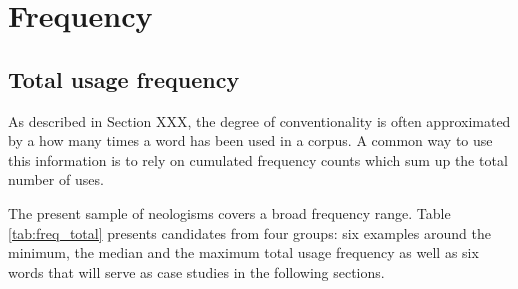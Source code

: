 \documentclass[a4paper, abstract=on]{scrartcl}
\begin{document}
\section{Frequency}

  \subsection{Total usage frequency}

    As described in Section XXX, the degree of conventionality is often approximated by a how many times a word has been used in a corpus. A common way to use this information is to rely on cumulated frequency counts which sum up the total number of uses.

    The present sample of neologisms covers a broad frequency range. Table \ref{tab:freq_total} presents candidates from four groups: six examples around the minimum, the median and the maximum total usage frequency as well as six words that will serve as case studies in the following sections.
\end{document}
